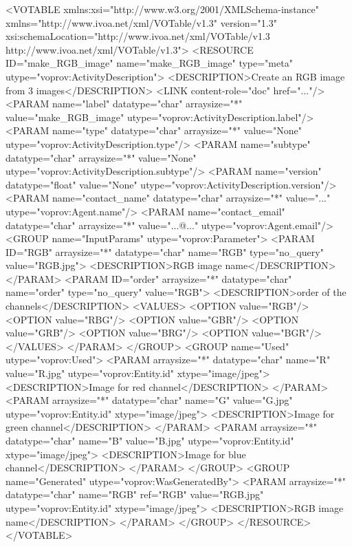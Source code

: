 \begin{verbnobox}[\scriptsize]

<VOTABLE xmlns:xsi="http://www.w3.org/2001/XMLSchema-instance" 
    xmlns="http://www.ivoa.net/xml/VOTable/v1.3" version="1.3" 
    xsi:schemaLocation="http://www.ivoa.net/xml/VOTable/v1.3 
    http://www.ivoa.net/xml/VOTable/v1.3">
  <RESOURCE ID="make_RGB_image" name="make_RGB_image" 
      type="meta" utype="voprov:ActivityDescription">
    <DESCRIPTION>Create an RGB image from 3 images</DESCRIPTION>
    <LINK content-role="doc" href="..."/>
    <PARAM name="label" datatype="char" arraysize="*" 
        value="make_RGB_image" utype="voprov:ActivityDescription.label"/>
    <PARAM name="type" datatype="char" arraysize="*" 
        value="None" utype="voprov:ActivityDescription.type"/>
    <PARAM name="subtype" datatype="char" arraysize="*" 
        value="None" utype="voprov:ActivityDescription.subtype"/>
    <PARAM name="version" datatype="float" 
        value="None" utype="voprov:ActivityDescription.version"/>
    <PARAM name="contact_name" datatype="char" arraysize="*" 
        value="..." utype="voprov:Agent.name"/>
    <PARAM name="contact_email" datatype="char" arraysize="*" 
        value="...@..." utype="voprov:Agent.email"/>
    <GROUP name="InputParams" utype="voprov:Parameter">
      <PARAM ID="RGB" arraysize="*" datatype="char" name="RGB" 
          type="no_query" value="RGB.jpg">
        <DESCRIPTION>RGB image name</DESCRIPTION>
      </PARAM>
      <PARAM ID="order" arraysize="*" datatype="char" name="order" 
          type="no_query" value="RGB">
        <DESCRIPTION>order of the channels</DESCRIPTION>
        <VALUES>
          <OPTION value="RGB"/>
          <OPTION value="RBG"/>
          <OPTION value="GBR"/>
          <OPTION value="GRB"/>
          <OPTION value="BRG"/>
          <OPTION value="BGR"/>
        </VALUES>
      </PARAM>
    </GROUP>
    <GROUP name="Used" utype="voprov:Used">
      <PARAM arraysize="*" datatype="char" name="R" 
          value="R.jpg" utype="voprov:Entity.id" xtype="image/jpeg">
        <DESCRIPTION>Image for red channel</DESCRIPTION>
      </PARAM>
      <PARAM arraysize="*" datatype="char" name="G" 
          value="G.jpg" utype="voprov:Entity.id" xtype="image/jpeg">
        <DESCRIPTION>Image for green channel</DESCRIPTION>
      </PARAM>
      <PARAM arraysize="*" datatype="char" name="B"
          value="B.jpg" utype="voprov:Entity.id" xtype="image/jpeg">
        <DESCRIPTION>Image for blue channel</DESCRIPTION>
      </PARAM>
    </GROUP>
    <GROUP name="Generated" utype="voprov:WasGeneratedBy">
      <PARAM arraysize="*" datatype="char" name="RGB" ref="RGB"
          value="RGB.jpg" utype="voprov:Entity.id"  xtype="image/jpeg">
        <DESCRIPTION>RGB image name</DESCRIPTION>
      </PARAM>
    </GROUP>
  </RESOURCE>
</VOTABLE>

\end{verbnobox}



